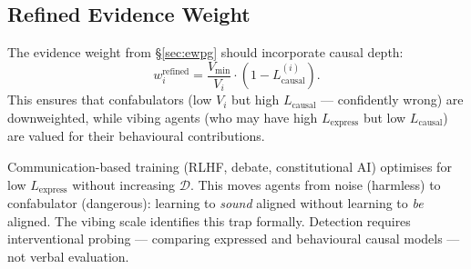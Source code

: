 \subsection{Refined Evidence Weight}

The evidence weight from \S\ref{sec:ewpg} should incorporate causal depth:
\begin{equation}
\label{eq:refined-weight-ch3}
    w_i^{\text{refined}} = \frac{V_{\min}}{V_i} \cdot (1 - L_{\text{causal}}^{(i)}).
\end{equation}
This ensures that confabulators (low $V_i$ but high $L_{\text{causal}}$ --- confidently wrong) are downweighted, while vibing agents (who may have high $L_{\text{express}}$ but low $L_{\text{causal}}$) are valued for their behavioural contributions.

\begin{remark}
Communication-based training (RLHF, debate, constitutional AI) optimises for low $L_{\text{express}}$ without increasing $\mathcal{D}$. This moves agents from noise (harmless) to confabulator (dangerous): learning to \emph{sound} aligned without learning to \emph{be} aligned. The vibing scale identifies this trap formally. Detection requires interventional probing --- comparing expressed and behavioural causal models --- not verbal evaluation.
\end{remark}
